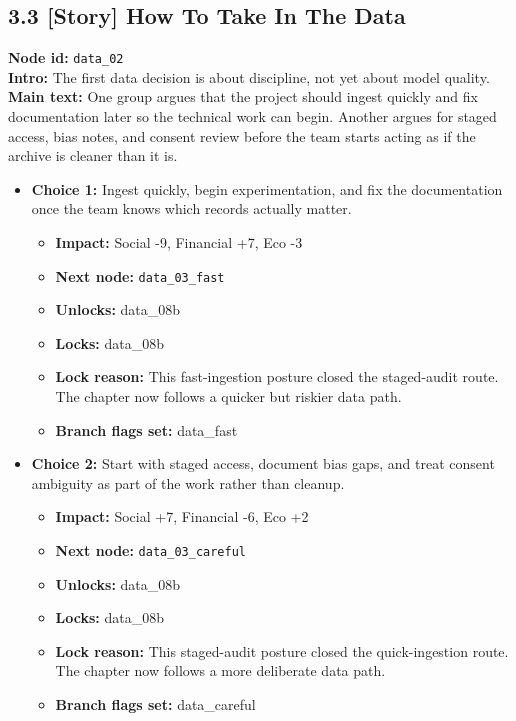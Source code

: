 \documentclass[11pt]{article}
\begin{document}
\subsection*{3.3 [Story] How To Take In The Data}
\textbf{Node id:} \texttt{data\_02}\\
\textbf{Intro:} The first data decision is about discipline, not yet about model quality.\\
\textbf{Main text:} One group argues that the project should ingest quickly and fix documentation later so the technical work can begin. Another argues for staged access, bias notes, and consent review before the team starts acting as if the archive is cleaner than it is.\\
\begin{itemize}
\item \textbf{Choice 1:} Ingest quickly, begin experimentation, and fix the documentation once the team knows which records actually matter.
\begin{itemize}
\item \textbf{Impact:} Social -9, Financial +7, Eco -3
\item \textbf{Next node:} \texttt{data\_03\_fast}
\item \textbf{Unlocks:} data\_08b
\item \textbf{Locks:} data\_08b
\item \textbf{Lock reason:} This fast-ingestion posture closed the staged-audit route. The chapter now follows a quicker but riskier data path.
\item \textbf{Branch flags set:} data\_fast
\end{itemize}
\item \textbf{Choice 2:} Start with staged access, document bias gaps, and treat consent ambiguity as part of the work rather than cleanup.
\begin{itemize}
\item \textbf{Impact:} Social +7, Financial -6, Eco +2
\item \textbf{Next node:} \texttt{data\_03\_careful}
\item \textbf{Unlocks:} data\_08b
\item \textbf{Locks:} data\_08b
\item \textbf{Lock reason:} This staged-audit posture closed the quick-ingestion route. The chapter now follows a more deliberate data path.
\item \textbf{Branch flags set:} data\_careful
\end{itemize}
\end{itemize}
\end{document}
